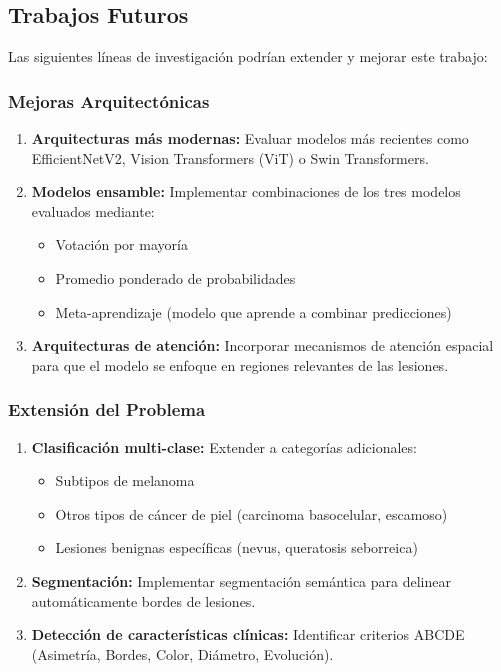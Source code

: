 \documentclass[11pt, a4paper]{article}
\begin{document}
\subsection{Trabajos Futuros}

Las siguientes líneas de investigación podrían extender y mejorar este trabajo:

\subsubsection{Mejoras Arquitectónicas}

\begin{enumerate}
    \item \textbf{Arquitecturas más modernas:} Evaluar modelos más recientes como EfficientNetV2, Vision Transformers (ViT) o Swin Transformers.
    
    \item \textbf{Modelos ensamble:} Implementar combinaciones de los tres modelos evaluados mediante:
    \begin{itemize}
        \item Votación por mayoría
        \item Promedio ponderado de probabilidades
        \item Meta-aprendizaje (modelo que aprende a combinar predicciones)
    \end{itemize}
    
    \item \textbf{Arquitecturas de atención:} Incorporar mecanismos de atención espacial para que el modelo se enfoque en regiones relevantes de las lesiones.
\end{enumerate}

\subsubsection{Extensión del Problema}

\begin{enumerate}
    \item \textbf{Clasificación multi-clase:} Extender a categorías adicionales:
    \begin{itemize}
        \item Subtipos de melanoma
        \item Otros tipos de cáncer de piel (carcinoma basocelular, escamoso)
        \item Lesiones benignas específicas (nevus, queratosis seborreica)
    \end{itemize}
    
    \item \textbf{Segmentación:} Implementar segmentación semántica para delinear automáticamente bordes de lesiones.
    
    \item \textbf{Detección de características clínicas:} Identificar criterios ABCDE (Asimetría, Bordes, Color, Diámetro, Evolución).
\end{enumerate}
\end{document}
